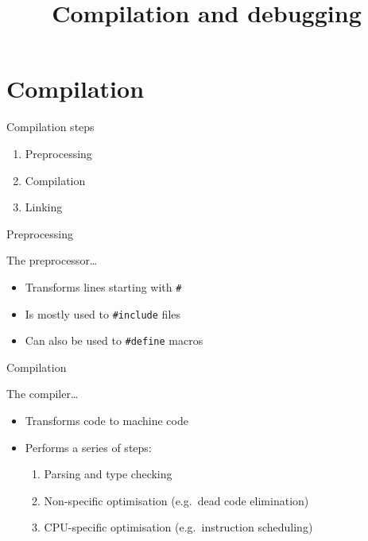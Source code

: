 

\title{Compilation and debugging}



\maketitle

\section{Compilation}

\begin{frame}{Compilation steps}
    \begin{enumerate}
        \item Preprocessing
        \item Compilation
        \item Linking
    \end{enumerate}
\end{frame}

\begin{frame}[fragile]{Preprocessing}
    \begin{block}{The preprocessor\ldots}
        \begin{itemize}
            \item Transforms lines starting with \texttt{#}
            \item Is mostly used to \texttt{#include} files
            \item Can also be used to \texttt{#define} macros
        \end{itemize}
    \end{block}
\end{frame}

\begin{frame}{Compilation}
    \begin{block}{The compiler\ldots}
        \begin{itemize}
            \item Transforms code to machine code
            \item Performs a series of steps:
                  \begin{enumerate}
                      \item Parsing and type checking
                      \item Non\hyp{}specific optimisation
                            (e.g.\ dead code elimination)
                      \item CPU\hyp{}specific optimisation
                            (e.g.\ instruction scheduling)
                  \end{enumerate}
        \end{itemize}
    \end{block}
\end{frame}

